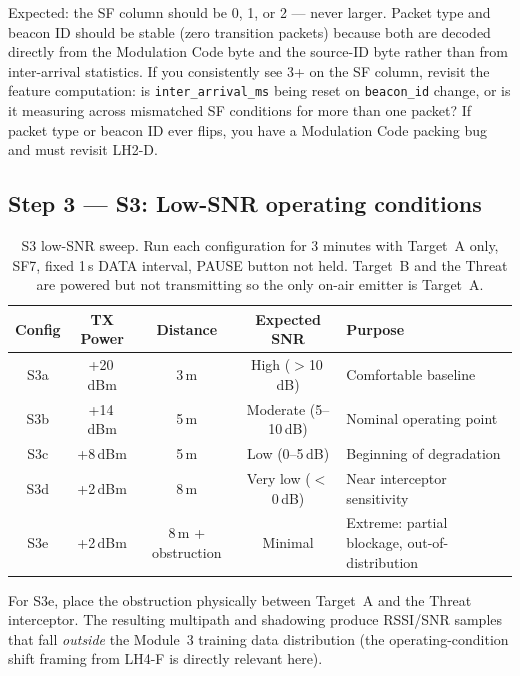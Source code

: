 \documentclass[11pt,letterpaper]{article}
\begin{document}
Expected: the SF column should be 0, 1, or 2 --- never larger. Packet type and beacon ID should be stable (zero transition packets) because both are decoded directly from the Modulation Code byte and the source-ID byte rather than from inter-arrival statistics. If you consistently see 3+ on the SF column, revisit the \FPGA{} feature computation: is \texttt{inter\_arrival\_ms} being reset on \texttt{beacon\_id} change, or is it measuring across mismatched SF conditions for more than one packet? If packet type or beacon ID ever flips, you have a Modulation Code packing bug and must revisit LH2-D.

\subsection{Step 3 --- S3: Low-SNR operating conditions}

\begin{table}[h!]
	\centering
	\renewcommand{\arraystretch}{1.3}
	\begin{tabularx}{\textwidth}{c c c c X}
		\toprule
		\textbf{Config} & \textbf{TX Power} & \textbf{Distance} & \textbf{Expected SNR} & \textbf{Purpose} \\
		\midrule
		S3a & +20\,dBm & 3\,m           & High ($>$10\,dB)  & Comfortable baseline \\
		S3b & +14\,dBm & 5\,m           & Moderate (5--10\,dB) & Nominal operating point \\
		S3c & +8\,dBm  & 5\,m           & Low (0--5\,dB)    & Beginning of degradation \\
		S3d & +2\,dBm  & 8\,m           & Very low ($<$0\,dB) & Near interceptor sensitivity \\
		S3e & +2\,dBm  & 8\,m + obstruction & Minimal       & Extreme: partial blockage, out-of-distribution \\
		\bottomrule
	\end{tabularx}
	\caption{S3 low-\mbox{SNR} sweep. Run each configuration for 3 minutes with Target~A only, SF7, fixed 1\,s DATA interval, PAUSE button not held. Target~B and the Threat are powered but not transmitting so the only on-air emitter is Target~A.}
\end{table}

For S3e, place the obstruction physically between Target~A and the Threat interceptor. The resulting multipath and shadowing produce \mbox{RSSI}/\mbox{SNR} samples that fall \emph{outside} the Module~3 training data distribution (the operating-condition shift framing from LH4-F is directly relevant here).
\end{document}
